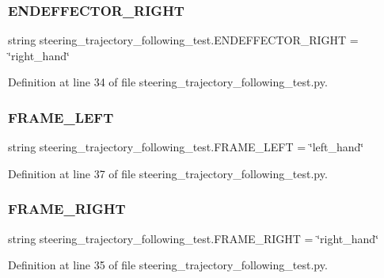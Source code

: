 \subsubsection{\texorpdfstring{ENDEFFECTOR\_RIGHT}{ENDEFFECTOR\_RIGHT}}
{\footnotesize\ttfamily string steering\+\_\+trajectory\+\_\+following\+\_\+test.\+E\+N\+D\+E\+F\+F\+E\+C\+T\+O\+R\+\_\+\+R\+I\+G\+HT = \char`\"{}right\+\_\+hand\char`\"{}}



Definition at line 34 of file steering\+\_\+trajectory\+\_\+following\+\_\+test.\+py.

\mbox{\label{namespacesteering__trajectory__following__test_a1715eb3be2d0df23493b6618f822a20b}} 
\subsubsection{\texorpdfstring{FRAME\_LEFT}{FRAME\_LEFT}}
{\footnotesize\ttfamily string steering\+\_\+trajectory\+\_\+following\+\_\+test.\+F\+R\+A\+M\+E\+\_\+\+L\+E\+FT = \char`\"{}left\+\_\+hand\char`\"{}}



Definition at line 37 of file steering\+\_\+trajectory\+\_\+following\+\_\+test.\+py.

\mbox{\label{namespacesteering__trajectory__following__test_ad2b3d81f8b97a726200a2c467b173ea7}} 
\subsubsection{\texorpdfstring{FRAME\_RIGHT}{FRAME\_RIGHT}}
{\footnotesize\ttfamily string steering\+\_\+trajectory\+\_\+following\+\_\+test.\+F\+R\+A\+M\+E\+\_\+\+R\+I\+G\+HT = \char`\"{}right\+\_\+hand\char`\"{}}



Definition at line 35 of file steering\+\_\+trajectory\+\_\+following\+\_\+test.\+py.

